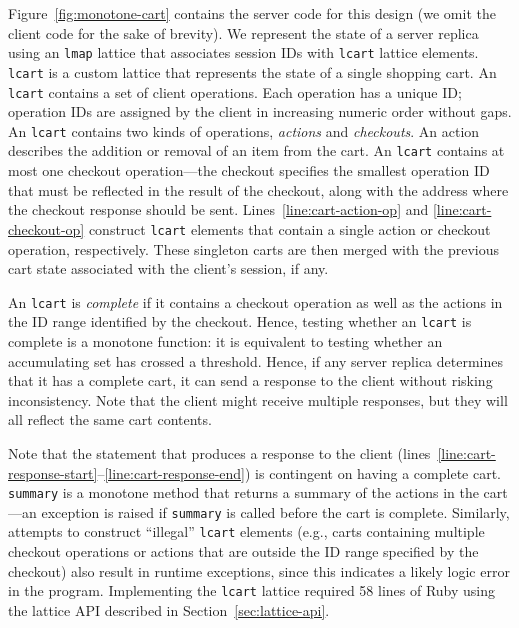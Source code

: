 
Figure~\ref{fig:monotone-cart} contains the server code for this design (we omit
the client code for the sake of brevity). We represent the state of a server
replica using an \texttt{lmap} lattice that associates session IDs with
\texttt{lcart} lattice elements. \texttt{lcart} is a custom lattice that
represents the state of a single shopping cart. An \texttt{lcart} contains a set
of client operations. Each operation has a unique ID; operation IDs are assigned
by the client in increasing numeric order without gaps. An \texttt{lcart}
contains two kinds of operations, \emph{actions} and \emph{checkouts}. An action
describes the addition or removal of an item from the cart. An \texttt{lcart}
contains at most one checkout operation---the checkout specifies the smallest
operation ID that must be reflected in the result of the checkout, along with
the address where the checkout response should be sent.
Lines~\ref{line:cart-action-op} and \ref{line:cart-checkout-op} construct
\texttt{lcart} elements that contain a single action or checkout operation,
respectively. These singleton carts are then merged with the previous cart state
associated with the client's session, if any.

An \texttt{lcart} is \emph{complete} if it contains a checkout operation as well
as the actions in the ID range identified by the checkout. Hence, testing
whether an \texttt{lcart} is complete is a monotone function: it is equivalent
to testing whether an accumulating set has crossed a threshold. Hence, if any
server replica determines that it has a complete cart, it can send a response to
the client without risking inconsistency. Note that the client might receive
multiple responses, but they will all reflect the same cart contents.

Note that the statement that produces a response to the client
(lines~\ref{line:cart-response-start}--\ref{line:cart-response-end}) is
contingent on having a complete cart. \texttt{summary} is a monotone method that
returns a summary of the actions in the cart---an exception is raised if
\texttt{summary} is called before the cart is complete. Similarly, attempts to
construct ``illegal'' \texttt{lcart} elements (e.g., carts containing multiple
checkout operations or actions that are outside the ID range specified by the
checkout) also result in runtime exceptions, since this indicates a likely logic
error in the program. Implementing the \texttt{lcart} lattice required 58 lines
of Ruby using the lattice API described in Section~\ref{sec:lattice-api}.

